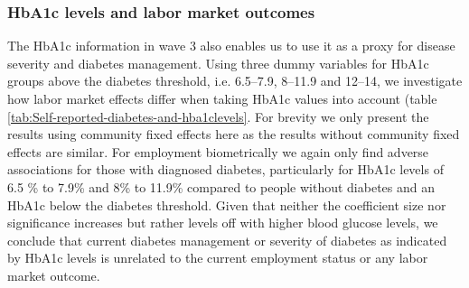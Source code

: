 \documentclass[12pt,english,british]{article}
\begin{document}
\subsubsection{HbA1c levels and labor market outcomes}

The \ac{HbA1c} information in wave 3 also enables us to use it as a proxy for disease
severity and diabetes management. Using three dummy variables for \ac{HbA1c} groups above the
diabetes threshold, i.e. 6.5--7.9, 8--11.9 and 12--14, we investigate
how labor market effects differ when taking \ac{HbA1c} values
into account (table \ref{tab:Self-reported-diabetes-and-hba1clevels}. For brevity we only present the results using community fixed effects here as the results without community fixed effects are similar. For employment biometrically
we again only find adverse associations for
those with diagnosed diabetes, particularly for \ac{HbA1c} levels of 6.5 \% to 7.9\%
and 8\% to 11.9\% compared to people without diabetes and an \ac{HbA1c} below the
diabetes threshold. Given that neither the coefficient size nor significance increases but rather levels off with higher blood glucose levels, we conclude that current diabetes management or severity of diabetes as indicated by \ac{HbA1c} levels is unrelated to the current employment status or any labor market outcome.
\end{document}
